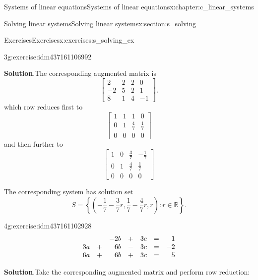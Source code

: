 \documentclass[oneside,10pt,]{book}
\makeatletter
\newcommand{\blocktitlefont}{\relax}
\numberwithin{equation}{section}
\newcommand{\R}{{\mathbb R}}
\newenvironment{linsys}[2][m]{
\begin{array}[#1]{@{}*{#2}{rc}r@{}}
}{
\end{array}}
\newcommand{\amp}{&}
\makeatother
\begin{document}
\begin{chapterptx}{Systems of linear equations}{}{Systems of linear equations}{}{}{x:chapter:c_linear_systems}
\begin{sectionptx}{Solving linear systems}{}{Solving linear systems}{}{}{x:section:s_solving}
\begin{exercises-subsection-numberless}{Exercises}{}{Exercises}{}{}{x:exercises:s_solving_ex}
\begin{exercisegroup}
\begin{divisionexerciseeg}{3}{}{}{g:exercise:idm437161106992}
%
\par\smallskip%
\noindent\textbf{\blocktitlefont Solution}.\hypertarget{g:solution:idm437161105888}{}\quad{}The corresponding augmented matrix is%
\begin{equation*}
\begin{bmatrix}2\amp 2\amp 2\amp 0\\ -2\amp 5\amp 2\amp 1\\ 8\amp 1\amp 4\amp -1 \end{bmatrix}\text{,}
\end{equation*}
which row reduces first to%
\begin{equation*}
\begin{bmatrix}1\amp 1\amp 1\amp 0\\ 0\amp 1\amp \frac{4}{7}\amp \frac{1}{7}\\ 0\amp 0\amp 0\amp 0 \end{bmatrix}
\end{equation*}
and then further to%
\begin{equation*}
\begin{bmatrix}1\amp 0\amp \frac{3}{7}\amp -\frac{1}{7}\\[1ex] 0\amp 1\amp \frac{4}{7}\amp \frac{1}{7}\\[1ex] 0\amp 0\amp 0\amp 0 \end{bmatrix}
\end{equation*}
%
\par
The corresponding system has solution set%
\begin{equation*}
S=\left\{\left(-\frac{1}{7}-\frac{3}{7}r,\frac{1}{7}-\frac{4}{7}r ,r\right)\colon r\in \R\right\}\text{.}
\end{equation*}
%
\end{divisionexerciseeg}%
\begin{divisionexerciseeg}{4}{}{}{g:exercise:idm437161102928}%
%
\begin{equation*}
\begin{linsys}{3} \amp \amp -2b  \amp +\amp 3c\amp =\amp 1\\ 3a \amp +\amp  6b \amp -\amp 3c\amp =\amp -2\\ 6a \amp +\amp   6b   \amp +\amp 3c\amp =\amp 5 \end{linsys}
\end{equation*}
%
\par\smallskip%
\noindent\textbf{\blocktitlefont Solution}.\hypertarget{g:solution:idm437161101840}{}\quad{}Take the corresponding augmented matrix and perform row reduction:%
\begin{align*}

\end{align*}
\end{divisionexerciseeg}
\end{exercisegroup}
\end{exercises-subsection-numberless}
\end{sectionptx}
\end{chapterptx}
\end{document}
